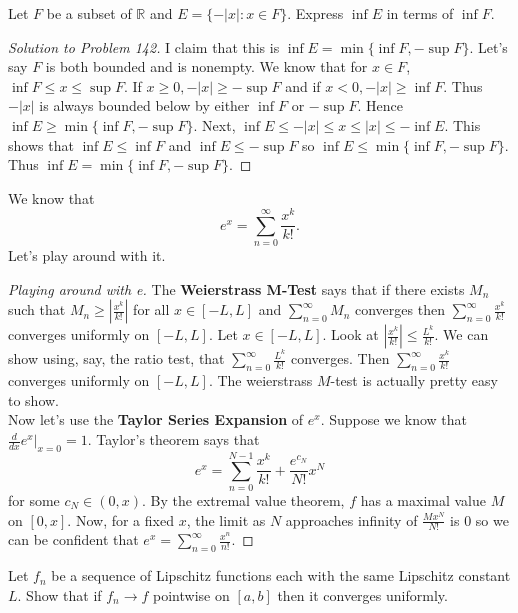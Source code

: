 \documentclass{article}
\newcommand{\vocab}[1]{\textbf{\color{blue!90}\boldmath #1}}
\newcommand{\R}{\mathbb{R}}
\newcommand{\ra}[1][]{\xrightarrow{#1}}
\begin{document}
\begin{problem}
  Let $F$ be a subset of $\R$ and $E=\{-|x|:x\in F\}$. Express $\inf E$ in terms of $\inf F$.
\end{problem}
\begin{proof}[Solution to Problem 142]
  I claim that this is $\inf E = \min\{\inf F,-\sup F\}$. Let's say $F$ is both bounded and is nonempty. We know that for $x\in F$, $\inf F\leq x\leq \sup F$. If $x\geq 0,-|x|\geq -\sup F$ and if $x<0,-|x|\geq \inf F$. Thus $-|x|$ is always bounded below by either $\inf F$ or $-\sup F$. Hence $\inf E\geq \min\{\inf F,-\sup F\}$.
  Next, $\inf E\leq -|x|\leq x\leq |x|\leq -\inf E$. This shows that $\inf E\leq \inf F$ and $\inf E\leq -\sup F$ so $\inf E\leq \min\{\inf F,-\sup F\}$. Thus $\inf E=\min\{\inf F,-\sup F\}$.
\end{proof}
\begin{problem}
  We know that $$e^x=\sum_{n=0}^\infty\frac{x^k}{k!}.$$ Let's play around with it.
\end{problem}
\begin{proof}[Playing around with e]
  The \vocab{Weierstrass M-Test} says that if there exists $M_n$ such that $M_n\geq |\frac{x^k}{k!}|$ for all $x\in[-L,L]$ and $\sum_{n=0}^\infty M_n$ converges then $\sum_{n=0}^\infty \frac{x^k}{k!}$ converges uniformly on $[-L,L]$. Let $x\in[-L,L]$.
  Look at $|\frac{x^k}{k!}|\leq \frac{L^k}{k!}$. We can show using, say, the ratio test, that $\sum_{n=0}^\infty\frac{L^k}{k!}$ converges. Then $\sum_{n=0}^\infty \frac{x^k}{k!}$ converges uniformly on $[-L,L]$. The weierstrass $M$-test is actually pretty easy to show.\\
  Now let's use the \vocab{Taylor Series Expansion} of $e^x$. Suppose we know that $\frac{d}{dx}e^x|_{x=0}=1$. Taylor's theorem says that
  $$e^x=\sum_{n=0}^{N-1}\frac{x^k}{k!}+\frac{e^{c_N}}{N!}x^N$$ for some $c_N\in(0,x)$. By the extremal value theorem, $f$ has a maximal value $M$ on $[0,x]$. Now, for a fixed $x$, the limit as $N$ approaches infinity of $\frac{Mx^N}{N!}$ is 0 so we can be confident that $e^x=\sum_{n=0}^\infty \frac{x^n}{n!}$.
\end{proof}
\begin{problem}
  Let $f_n$ be a sequence of Lipschitz functions each with the same Lipschitz constant $L$. Show that if $f_n\ra f$ pointwise on $[a,b]$ then it converges uniformly.
\end{problem}
\end{document}
